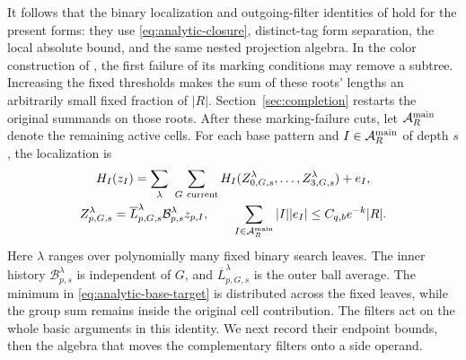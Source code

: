 It follows that the binary localization and outgoing-filter
identities of \cite[Proposition~6.8 and Lemma~6.9]{H} hold for
the present forms: they use \eqref{eq:analytic-closure}, distinct-tag
form separation, the local absolute bound, and the same nested
projection algebra.  In the color construction of
\cite[Lemma~6.3]{H}, the first failure of its marking conditions
may remove a subtree.  Increasing the fixed thresholds makes the
sum of these roots' lengths an arbitrarily small fixed fraction
of \(|R|\).  Section~\ref{sec:completion} restarts the original
summands on those roots.  After these marking-failure cuts, let
\(\mathcal A_R^{\rm main}\) denote the remaining active cells.
For each base pattern and \(I\in\mathcal A_R^{\rm main}\) of depth
\(s\), the localization is
\begin{equation}
 \begin{gathered}
 H_I(z_I)=\sum_\lambda\ \sum_{G\ {\rm current}}
       H_I(Z^\lambda_{0,G,s},\ldots,Z^\lambda_{3,G,s})+e_I,\\
 Z^\lambda_{p,G,s}
       =\overline L^\lambda_{p,G,s}\mathcal B^\lambda_{p,s}z_{p,I},
 \qquad
 \sum_{I\in\mathcal A_R^{\rm main}}|I||e_I|
           \le C_{q,b}e^{-k}|R|.
 \end{gathered}
 \label{eq:analytic-localization}
\end{equation}
Here \(\lambda\) ranges over polynomially many fixed binary search
leaves.  The inner history \(\mathcal B^\lambda_{p,s}\) is independent
of \(G\), and \(\overline L^\lambda_{p,G,s}\) is the outer ball
average.  The minimum in \eqref{eq:analytic-base-target} is
distributed across the fixed leaves, while the group sum remains
inside the original cell contribution.  The filters act on the
whole basic arguments in this identity.  We next record their
endpoint bounds, then the algebra that moves the complementary
filters onto a side operand.

